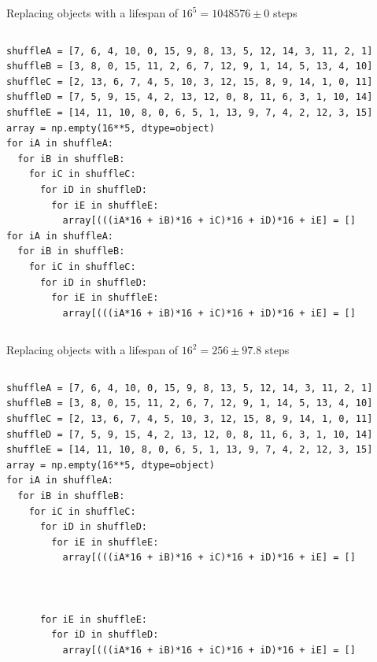 \documentclass[aspectratio=169]{beamer}
\begin{document}
\begin{frame}[fragile]{Replacing objects with a lifespan of $16^5 = 1048576 \pm 0$ steps}
\small
\begin{columns}
\begin{verbatim}
shuffleA = [7, 6, 4, 10, 0, 15, 9, 8, 13, 5, 12, 14, 3, 11, 2, 1]
shuffleB = [3, 8, 0, 15, 11, 2, 6, 7, 12, 9, 1, 14, 5, 13, 4, 10]
shuffleC = [2, 13, 6, 7, 4, 5, 10, 3, 12, 15, 8, 9, 14, 1, 0, 11]
shuffleD = [7, 5, 9, 15, 4, 2, 13, 12, 0, 8, 11, 6, 3, 1, 10, 14]
shuffleE = [14, 11, 10, 8, 0, 6, 5, 1, 13, 9, 7, 4, 2, 12, 3, 15]
array = np.empty(16**5, dtype=object)
for iA in shuffleA:
  for iB in shuffleB:
    for iC in shuffleC:
      for iD in shuffleD:
        for iE in shuffleE:
          array[(((iA*16 + iB)*16 + iC)*16 + iD)*16 + iE] = []
for iA in shuffleA:
  for iB in shuffleB:
    for iC in shuffleC:
      for iD in shuffleD:
        for iE in shuffleE:
          array[(((iA*16 + iB)*16 + iC)*16 + iD)*16 + iE] = []
\end{verbatim}
\end{columns}
\end{frame}

\begin{frame}[fragile]{Replacing objects with a lifespan of $16^2 = 256 \pm 97.8$ steps}
\small
\begin{columns}
\begin{verbatim}
shuffleA = [7, 6, 4, 10, 0, 15, 9, 8, 13, 5, 12, 14, 3, 11, 2, 1]
shuffleB = [3, 8, 0, 15, 11, 2, 6, 7, 12, 9, 1, 14, 5, 13, 4, 10]
shuffleC = [2, 13, 6, 7, 4, 5, 10, 3, 12, 15, 8, 9, 14, 1, 0, 11]
shuffleD = [7, 5, 9, 15, 4, 2, 13, 12, 0, 8, 11, 6, 3, 1, 10, 14]
shuffleE = [14, 11, 10, 8, 0, 6, 5, 1, 13, 9, 7, 4, 2, 12, 3, 15]
array = np.empty(16**5, dtype=object)
for iA in shuffleA:
  for iB in shuffleB:
    for iC in shuffleC:
      for iD in shuffleD:
        for iE in shuffleE:
          array[(((iA*16 + iB)*16 + iC)*16 + iD)*16 + iE] = []



      for iE in shuffleE:
        for iD in shuffleD:
          array[(((iA*16 + iB)*16 + iC)*16 + iD)*16 + iE] = []
\end{verbatim}
\end{columns}
\end{frame}
\end{document}
